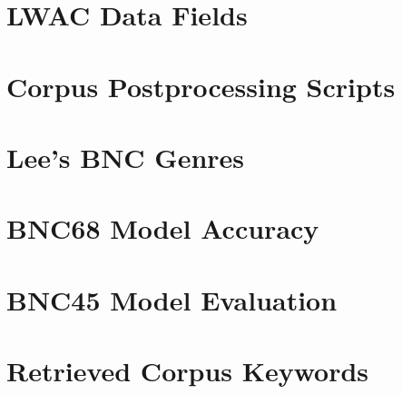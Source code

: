 

\section{LWAC Data Fields}
\label{sec:appx:fields}


\pagebreak
\section{Corpus Postprocessing Scripts}
\label{sec:appx:postprocess}


\pagebreak
\section{Lee's BNC Genres}
\label{sec:appx:sample}


\pagebreak
\section{BNC68 Model Accuracy}
\label{sec:appx:bayesianbnc68}


\pagebreak
\section{BNC45 Model Evaluation}
\label{sec:appx:bayesevaluation}




\pagebreak
\section{Retrieved Corpus Keywords}
\label{sec:appx:keywords}





